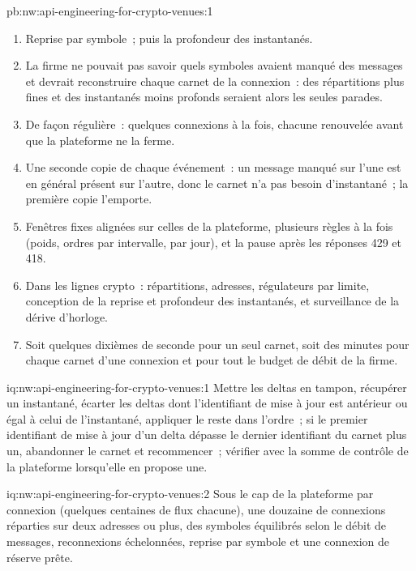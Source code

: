 \begin{solution}{pb:nw:api-engineering-for-crypto-venues:1}
\begin{enumerate}[resume]
  secondes-symbole périmées avec la reprise par symbole, et 5\,769 secondes-symbole (le dernier carnet revenu après trois minutes) avec la reprise par connexion, à partir de
  d'instantanés de pleine profondeur.
\item Reprise par symbole~; puis la profondeur des instantanés.
\item La firme ne pouvait pas savoir quels symboles avaient manqué des messages et devrait reconstruire chaque carnet de la connexion~: des répartitions plus fines et des instantanés moins
  profonds seraient alors les seules parades.
\item De façon régulière~: quelques connexions à la fois, chacune renouvelée avant que la plateforme ne la ferme.
\item Une seconde copie de chaque événement~: un message manqué sur l'une est en général présent sur l'autre, donc le carnet n'a pas besoin d'instantané~; la première copie l'emporte.
\item Fenêtres fixes alignées sur celles de la plateforme, plusieurs règles à la fois (poids, ordres par intervalle, par jour), et la pause après les réponses 429 et 418.
\item Dans les lignes crypto~: répartitions, adresses, régulateurs par limite, conception de la reprise et profondeur des instantanés, et surveillance de la dérive d'horloge.
\item Soit quelques dixièmes de seconde pour un seul carnet, soit des minutes pour chaque carnet d'une connexion et pour tout le budget de débit de la firme.
\end{enumerate}
\end{solution}

\begin{solution}{iq:nw:api-engineering-for-crypto-venues:1}
Mettre les deltas en tampon, récupérer un instantané, écarter les deltas dont l'identifiant de mise à jour est antérieur ou égal à celui de l'instantané, appliquer le reste dans l'ordre~; si le premier identifiant de mise à jour d'un delta dépasse
le dernier identifiant du carnet plus un, abandonner le carnet et recommencer~; vérifier avec la somme de contrôle de la plateforme lorsqu'elle en propose une.
\end{solution}

\begin{solution}{iq:nw:api-engineering-for-crypto-venues:2}
Sous le cap de la plateforme par connexion (quelques centaines de flux chacune), une douzaine de connexions réparties sur deux adresses ou plus, des symboles équilibrés selon le
débit de messages, reconnexions échelonnées, reprise par symbole et une connexion de réserve prête.
\end{solution}

